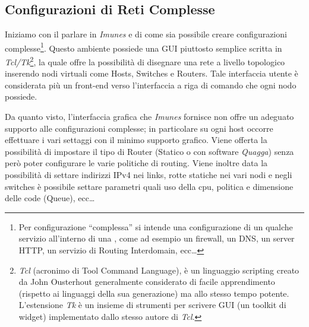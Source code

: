 \subsection{Configurazioni di Reti Complesse}\label{subsection:ccrc}
Iniziamo con il parlare in \emph{Imunes} e di come sia possibile creare configurazioni complesse\footnote{Per configurazione ``complessa'' si intende una configurazione di un qualche servizio all'interno di una \virtualmachine{}, come ad esempio un firewall, un DNS, un server HTTP, un servizio di Routing Interdomain, ecc\ldots}.
Questo ambiente possiede una GUI piuttosto semplice scritta in \emph{Tcl/Tk}\footnote{\emph{Tcl} (acronimo di Tool Command Language), è un linguaggio scripting creato da John Ousterhout generalmente considerato di facile apprendimento (rispetto ai linguaggi della sua generazione) ma allo stesso tempo potente. L'estensione \emph{Tk} è un insieme di strumenti per scrivere GUI (un toolkit di widget) implementato dallo stesso autore di \emph{Tcl}.}, la quale offre la possibilità di disegnare una rete a livello topologico inserendo nodi virtuali come Hosts, Switches e Routers. Tale interfaccia utente è considerata più un front-end verso l'interfaccia a riga di comando che ogni nodo possiede.

Da quanto visto\cite{IMUNESHOWTO}, l'interfaccia grafica che \emph{Imunes} fornisce non offre un adeguato supporto alle configurazioni complesse; in particolare su ogni host occorre effettuare i vari settaggi con il minimo supporto grafico. Viene offerta la possibilità di impostare il tipo di Router (Statico o con software \emph{Quagga}) senza però poter configurare le varie politiche di routing. Viene inoltre data la possibilità di settare indirizzi IPv4 nei links, rotte statiche nei vari nodi e negli switches è possibile settare parametri quali uso della cpu, politica e dimensione delle code (Queue), ecc\ldots

